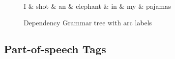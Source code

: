 \begin{figure}
    \centering
    \begin{dependency}
        \begin{deptext}
        I \& shot \& an \& elephant \& in \& my \& pajamas \\
        \end{deptext}
    \end{dependency}
    \caption{Dependency Grammar tree with arc labels}
    \label{fig:dependency_tree_label}
\end{figure}

\subsection{Part-of-speech Tags}
